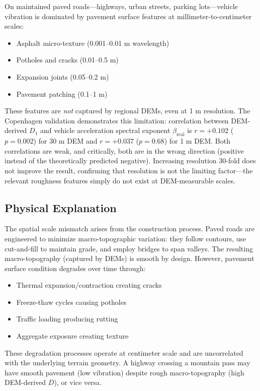 \documentclass[11pt,letterpaper]{article}
\begin{document}
On maintained paved roads---highways, urban streets, parking lots---vehicle vibration is dominated by pavement surface features at millimeter-to-centimeter scales:
\begin{itemize}
\item Asphalt micro-texture (0.001--0.01 m wavelength)
\item Potholes and cracks (0.01--0.5 m)
\item Expansion joints (0.05--0.2 m)
\item Pavement patching (0.1--1 m)
\end{itemize}

These features are \textit{not} captured by regional DEMs, even at 1 m resolution. The Copenhagen validation demonstrates this limitation: correlation between DEM-derived $D_1$ and vehicle acceleration spectral exponent $\beta_{\text{real}}$ is $r = +0.102$ ($p = 0.002$) for 30 m DEM and $r = +0.037$ ($p = 0.68$) for 1 m DEM. Both correlations are weak, and critically, both are in the wrong direction (positive instead of the theoretically predicted negative). Increasing resolution 30-fold does not improve the result, confirming that resolution is not the limiting factor---the relevant roughness features simply do not exist at DEM-measurable scales.

\subsection{Physical Explanation}

The spatial scale mismatch arises from the construction process. Paved roads are engineered to minimize macro-topographic variation: they follow contours, use cut-and-fill to maintain grade, and employ bridges to span valleys. The resulting macro-topography (captured by DEMs) is smooth by design. However, pavement surface condition degrades over time through:
\begin{itemize}
\item Thermal expansion/contraction creating cracks
\item Freeze-thaw cycles causing potholes
\item Traffic loading producing rutting
\item Aggregate exposure creating texture
\end{itemize}

These degradation processes operate at centimeter scale and are uncorrelated with the underlying terrain geometry. A highway crossing a mountain pass may have smooth pavement (low vibration) despite rough macro-topography (high DEM-derived $D$), or vice versa.
\end{document}
